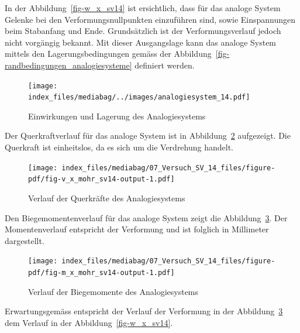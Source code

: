 \documentclass[
  12pt,
  letterpaper,
  egregdoesnotlikesansseriftitles]{scrreprt}
\begin{document}
In der Abbildung~\ref{fig-w_x_sv14} ist ersichtlich, dass für das
analoge System Gelenke bei den Verformungsnullpunkten einzuführen sind,
sowie Einspannungen beim Stabanfang und Ende. Grundsätzlich ist der
Verformungsverlauf jedoch nicht vorgängig bekannt. Mit dieser
Ausgangslage kann das analoge System mittels den Lagerungsbedingungen
gemäss der Abbildung~\ref{fig-randbedingungen_analogiesysteme} definiert
werden.

\begin{figure}[H]

{\centering \texttt{[image: index\_files/mediabag/../images/analogiesystem\_14.pdf]}

}

\caption{\label{fig-analogiesystem_sv14}Einwirkungen und Lagerung des
Analogiesystems}

\end{figure}

Der Querkraftverlauf für das analoge System ist in
Abbildung~\ref{fig-v_x_mohr_sv14} aufgezeigt. Die Querkraft ist
einheitslos, da es sich um die Verdrehung handelt.

\begin{figure}[H]

{\centering \texttt{[image: index\_files/mediabag/07\_Versuch\_SV\_14\_files/figure-pdf/fig-v\_x\_mohr\_sv14-output-1.pdf]}

}

\caption{\label{fig-v_x_mohr_sv14}Verlauf der Querkräfte des
Analogiesystems}

\end{figure}

Den Biegemomentenverlauf für das analoge System zeigt die
Abbildung~\ref{fig-m_x_mohr_sv14}. Der Momentenverlauf entspricht der
Verformung und ist folglich in Millimeter dargestellt.

\begin{figure}[H]

{\centering \texttt{[image: index\_files/mediabag/07\_Versuch\_SV\_14\_files/figure-pdf/fig-m\_x\_mohr\_sv14-output-1.pdf]}

}

\caption{\label{fig-m_x_mohr_sv14}Verlauf der Biegemomente des
Analogiesystems}

\end{figure}

Erwartungsgemäss entspricht der Verlauf der Verformung in der
Abbildung~\ref{fig-m_x_mohr_sv14} dem Verlauf in der
Abbildung~\ref{fig-w_x_sv14}.
\end{document}
